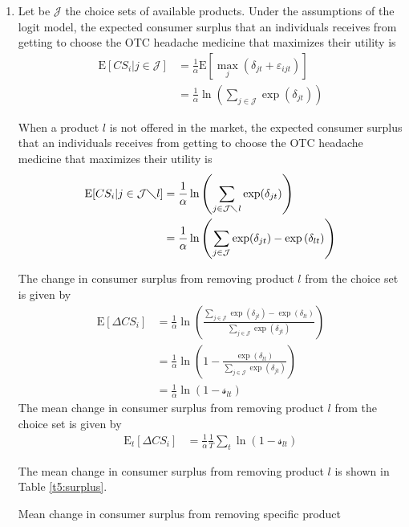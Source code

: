 \documentclass{article}
\newcommand{\E}{\text{E}}
\begin{document}
\begin{enumerate}
\begin{table}[H]
\centering
\caption{Mean own price elasticity for different product across specifications}\label{t4:elasticity}
\begin{threeparttable}

\end{threeparttable}
\end{table}

\item Let be $\mathcal{J}$ the choice sets of available products. Under the assumptions of the logit model, the expected consumer surplus that an individuals receives
from getting to choose the OTC headache medicine that maximizes their utility is
\begin{align*}
\E[CS_i|j\in \mathcal{J}]&=\frac{1}{\alpha} \E[\max_j (\delta_{jt}+\varepsilon_{ijt})]\\
&=\frac{1}{\alpha} \ln\left(\sum_{j\in \mathcal{J}}\exp(\delta_{jt})\right)
\end{align*}

When a product $l$ is not offered in the market, the expected consumer surplus that an individuals receives from getting to choose the OTC headache medicine that maximizes their utility is
\begin{align*}
    \E[CS_i|j\in \mathcal{J}\diagdown l]&=\frac{1}{\alpha} \ln\left(\sum_{j\in \mathcal{J}\diagdown l}\exp(\delta_{jt})\right)\\
    &=\frac{1}{\alpha} \ln\left(\sum_{j\in \mathcal{J}}\exp(\delta_{jt})-\exp{(\delta_{lt})}\right)
\end{align*}

The change in consumer surplus from removing product $l$ from the choice set is given by
\begin{align*}
    \E[\Delta CS_i]&=\frac{1}{\alpha} \ln\left(\frac{\sum_{j\in \mathcal{J}}\exp(\delta_{jt})-\exp{(\delta_{lt})}}{\sum_{j\in \mathcal{J}}\exp{(\delta_{jt})}}\right)\\
    &=\frac{1}{\alpha}\ln\left(1-\frac{\exp{(\delta_{lt})}}{\sum_{j\in \mathcal{J}}\exp{(\delta_{jt})}}\right)\\
    &=\frac{1}{\alpha}\ln\left(1-\mathcal{s}_{lt}\right)
\end{align*}
The mean change in consumer surplus from removing product $l$ from the choice set is given by
\begin{align*}
    \E_t[\Delta CS_i]&=\frac{1}{\alpha} \frac{1}{T}\sum_{t}\ln\left(1-\mathcal{s}_{lt}\right)
\end{align*}

The mean change in consumer surplus from removing product $l$ is shown in Table \ref{t5:surplus}.

\begin{table}[H]
\centering
\caption{Mean change in consumer surplus from removing specific product}\label{t5:surplus}
\begin{threeparttable}

\end{threeparttable}
\end{table}

\end{enumerate}
\end{document}
